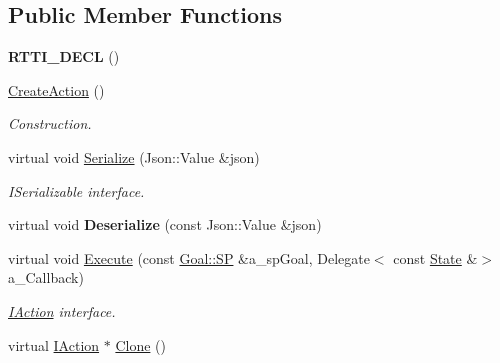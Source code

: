 \subsection*{Public Member Functions}
\begin{DoxyCompactItemize}
\item 
\mbox{\label{class_create_action_af604f763d3ead8f78a4707cdd17a386c}} 
{\bfseries R\+T\+T\+I\+\_\+\+D\+E\+CL} ()
\item 
\mbox{\label{class_create_action_ace7af1feef3a0ba0b101256e74d58996}} 
\hyperlink{class_create_action_ace7af1feef3a0ba0b101256e74d58996}{Create\+Action} ()
\begin{DoxyCompactList}\small\item\em Construction. \end{DoxyCompactList}\item 
\mbox{\label{class_create_action_ad8a4b25a8c77d8e379e0f39f84a537a6}} 
virtual void \hyperlink{class_create_action_ad8a4b25a8c77d8e379e0f39f84a537a6}{Serialize} (Json\+::\+Value \&json)
\begin{DoxyCompactList}\small\item\em I\+Serializable interface. \end{DoxyCompactList}\item 
\mbox{\label{class_create_action_a3b3f5527b6ac1747927808d76f744188}} 
virtual void {\bfseries Deserialize} (const Json\+::\+Value \&json)
\item 
\mbox{\label{class_create_action_ac23070e18aa583e373a9e26c7ab6d3a8}} 
virtual void \hyperlink{class_create_action_ac23070e18aa583e373a9e26c7ab6d3a8}{Execute} (const \hyperlink{class_goal_a818ae12a4d1f28bd433dab2a830a390e}{Goal\+::\+SP} \&a\+\_\+sp\+Goal, Delegate$<$ const \hyperlink{struct_i_action_1_1_state}{State} \&$>$ a\+\_\+\+Callback)
\begin{DoxyCompactList}\small\item\em \hyperlink{class_i_action}{I\+Action} interface. \end{DoxyCompactList}\item 
\mbox{\label{class_create_action_a4e8abe3c1f0e767c8536a20e59c5acfa}} 
virtual \hyperlink{class_i_action}{I\+Action} $\ast$ \hyperlink{class_create_action_a4e8abe3c1f0e767c8536a20e59c5acfa}{Clone} ()

\end{DoxyCompactItemize}
